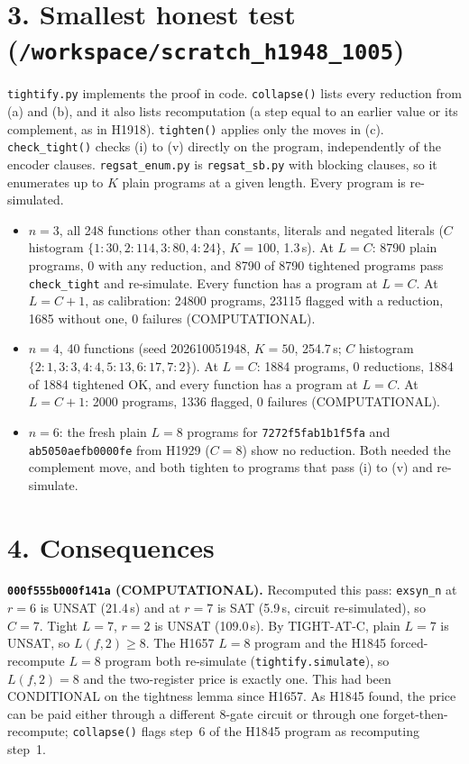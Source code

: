\documentclass[11pt]{article}
\begin{document}
\section*{3. Smallest honest test (\texttt{/workspace/scratch\_h1948\_1005})}
\texttt{tightify.py} implements the proof in code. \texttt{collapse()} lists every reduction from (a) and (b), and it also lists recomputation (a step equal to an earlier value or its complement, as in H1918). \texttt{tighten()} applies only the moves in (c). \texttt{check\_tight()} checks (i) to (v) directly on the program, independently of the encoder clauses. \texttt{regsat\_enum.py} is \texttt{regsat\_sb.py} with blocking clauses, so it enumerates up to $K$ plain programs at a given length. Every program is re-simulated.
\begin{itemize}
\item $n=3$, all 248 functions other than constants, literals and negated literals ($C$ histogram $\{1{:}30,2{:}114,3{:}80,4{:}24\}$, $K=100$, 1.3\,s). At $L=C$: 8790 plain programs, 0 with any reduction, and 8790 of 8790 tightened programs pass \texttt{check\_tight} and re-simulate. Every function has a program at $L=C$. At $L=C+1$, as calibration: 24800 programs, 23115 flagged with a reduction, 1685 without one, 0 failures (COMPUTATIONAL).
\item $n=4$, 40 functions (seed 202610051948, $K=50$, 254.7\,s; $C$ histogram $\{2{:}1,3{:}3,4{:}4,5{:}13,6{:}17,7{:}2\}$). At $L=C$: 1884 programs, 0 reductions, 1884 of 1884 tightened OK, and every function has a program at $L=C$. At $L=C+1$: 2000 programs, 1336 flagged, 0 failures (COMPUTATIONAL).
\item $n=6$: the fresh plain $L=8$ programs for \texttt{7272f5fab1b1f5fa} and \texttt{ab5050aefb0000fe} from H1929 ($C=8$) show no reduction. Both needed the complement move, and both tighten to programs that pass (i) to (v) and re-simulate.
\end{itemize}

\section*{4. Consequences}
\textbf{\texttt{000f555b000f141a} (COMPUTATIONAL).} Recomputed this pass: \texttt{exsyn\_n} at $r=6$ is UNSAT (21.4\,s) and at $r=7$ is SAT (5.9\,s, circuit re-simulated), so $C=7$. Tight $L=7$, $r=2$ is UNSAT (109.0\,s). By TIGHT-AT-C, plain $L=7$ is UNSAT, so $L(f,2)\ge 8$. The H1657 $L=8$ program and the H1845 forced-recompute $L=8$ program both re-simulate (\texttt{tightify.simulate}), so $L(f,2)=8$ and the two-register price is exactly one. This had been CONDITIONAL on the tightness lemma since H1657. As H1845 found, the price can be paid either through a different 8-gate circuit or through one forget-then-recompute; \texttt{collapse()} flags step~6 of the H1845 program as recomputing step~1.
\end{document}

